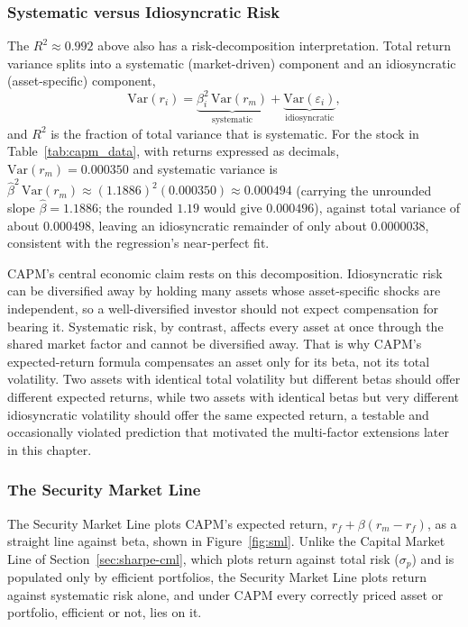 \documentclass[../ai_in_finance]{subfiles}
\begin{document}
\subsubsection*{Systematic versus Idiosyncratic Risk}

The $R^2 \approx 0.992$ above also has a risk-decomposition interpretation. Total return variance splits into a systematic (market-driven) component and an idiosyncratic (asset-specific) component,
\begin{equation*}
\text{Var}(r_i) = \underbrace{\beta_i^2\,\text{Var}(r_m)}_{\text{systematic}} + \underbrace{\text{Var}(\varepsilon_i)}_{\text{idiosyncratic}},
\end{equation*}
and $R^2$ is the fraction of total variance that is systematic. For the stock in Table~\ref{tab:capm_data}, with returns expressed as decimals, $\text{Var}(r_m) = 0.000350$ and systematic variance is $\hat\beta^2\,\text{Var}(r_m) \approx (1.1886)^2(0.000350) \approx 0.000494$ (carrying the unrounded slope $\hat\beta = 1.1886$; the rounded $1.19$ would give $0.000496$), against total variance of about $0.000498$, leaving an idiosyncratic remainder of only about $0.0000038$, consistent with the regression's near-perfect fit.

CAPM's central economic claim rests on this decomposition. Idiosyncratic risk can be diversified away by holding many assets whose asset-specific shocks are independent, so a well-diversified investor should not expect compensation for bearing it.
Systematic risk, by contrast, affects every asset at once through the shared market factor and cannot be diversified away. That is why CAPM's expected-return formula compensates an asset only for its beta, not its total volatility. Two assets with identical total volatility but different betas should offer different expected returns, while two assets with identical betas but very different idiosyncratic volatility should offer the same expected return, a testable and occasionally violated prediction that motivated the multi-factor extensions later in this chapter.

\subsubsection*{The Security Market Line}

The Security Market Line plots CAPM's expected return, $r_f + \beta(r_m-r_f)$, as a straight line against beta, shown in Figure~\ref{fig:sml}. Unlike the Capital Market Line of Section~\ref{sec:sharpe-cml}, which plots return against total risk ($\sigma_p$) and is populated only by efficient portfolios, the Security Market Line plots return against systematic risk alone, and under CAPM every correctly priced asset or portfolio, efficient or not, lies on it.
\end{document}
